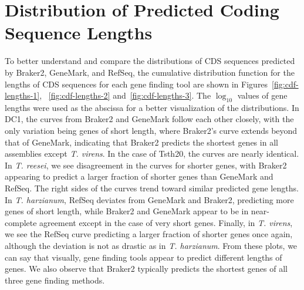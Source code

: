 \section{Distribution of Predicted Coding Sequence Lengths}\label{section:lengths}

To better understand and compare the distributions of CDS sequences
predicted by Braker2, GeneMark, and RefSeq, the cumulative
distribution function for the lengths of CDS sequences for each gene
finding tool are shown in Figures~\ref{fig:cdf-lengths-1},
~\ref{fig:cdf-lengths-2} and~\ref{fig:cdf-lengths-3}. The $\log_{10}$
values of gene lengths were used as the abscissa for a better
visualization of the distributions. In DC1, the curves from Braker2 and
GeneMark follow each other closely, with the only variation being
genes of short length, where Braker2's curve extends beyond that of
GeneMark, indicating that Braker2 predicts the shortest genes in all
assemblies except \textit{T. virens}. In the case of Tsth20, the
curves are nearly identical. In \textit{T. reesei}, we see
disagreement in the curves for shorter genes, with Braker2 appearing
to predict a larger fraction of shorter genes than GeneMark and
RefSeq. The right sides of the curves trend toward similar predicted
gene lengths. In \textit{T. harzianum}, RefSeq deviates from GeneMark
and Braker2, predicting more genes of short length, while Braker2 and
GeneMark appear to be in near-complete agreement except in the case of
very short genes. Finally, in \textit{T. virens}, we see the RefSeq
curve predicting a larger fraction of shorter genes once again,
although the deviation is not as drastic as in
\textit{T. harzianum}. From these plots, we can say that visually, gene
finding tools appear to predict different lengths of genes. We also
observe that Braker2 typically predicts the shortest genes of all
three gene finding methods.


